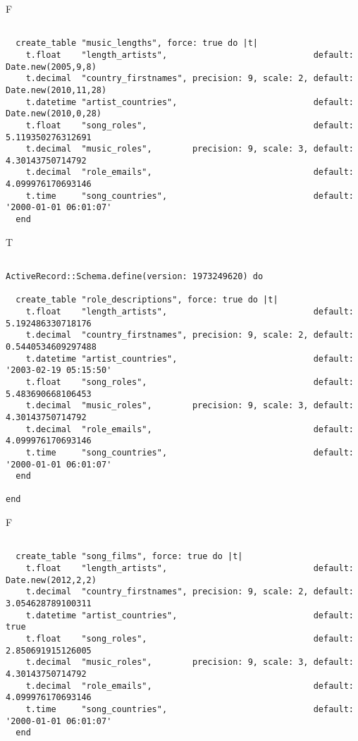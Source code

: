 F
\begin{verbatim}

  create_table "music_lengths", force: true do |t|
    t.float    "length_artists",                             default: Date.new(2005,9,8)
    t.decimal  "country_firstnames", precision: 9, scale: 2, default: Date.new(2010,11,28)
    t.datetime "artist_countries",                           default: Date.new(2010,0,28)
    t.float    "song_roles",                                 default: 5.119350276312691
    t.decimal  "music_roles",        precision: 9, scale: 3, default: 4.30143750714792
    t.decimal  "role_emails",                                default: 4.099976170693146
    t.time     "song_countries",                             default: '2000-01-01 06:01:07'
  end

\end{verbatim}

T
\begin{verbatim}

ActiveRecord::Schema.define(version: 1973249620) do

  create_table "role_descriptions", force: true do |t|
    t.float    "length_artists",                             default: 5.192486330718176
    t.decimal  "country_firstnames", precision: 9, scale: 2, default: 0.5440534609297488
    t.datetime "artist_countries",                           default: '2003-02-19 05:15:50'
    t.float    "song_roles",                                 default: 5.483690668106453
    t.decimal  "music_roles",        precision: 9, scale: 3, default: 4.30143750714792
    t.decimal  "role_emails",                                default: 4.099976170693146
    t.time     "song_countries",                             default: '2000-01-01 06:01:07'
  end

end
\end{verbatim}


F
\begin{verbatim}

  create_table "song_films", force: true do |t|
    t.float    "length_artists",                             default: Date.new(2012,2,2)
    t.decimal  "country_firstnames", precision: 9, scale: 2, default: 3.054628789100311
    t.datetime "artist_countries",                           default: true
    t.float    "song_roles",                                 default: 2.850691915126005
    t.decimal  "music_roles",        precision: 9, scale: 3, default: 4.30143750714792
    t.decimal  "role_emails",                                default: 4.099976170693146
    t.time     "song_countries",                             default: '2000-01-01 06:01:07'
  end

\end{verbatim}

